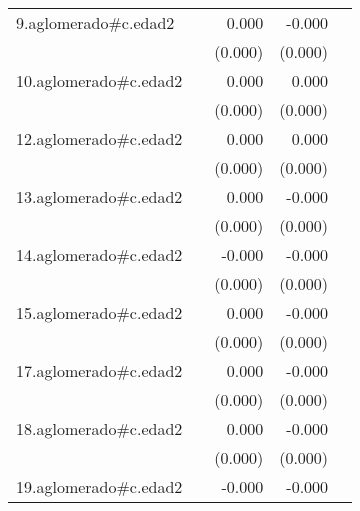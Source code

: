 {\begin{longtable}{l*{4}{D{.}{.}{-1}}}
\addlinespace
9.aglomerado#c.edad2&                     &       0.000         &      -0.000         &                     \\
            &                     &     (0.000)         &     (0.000)         &                     \\
\addlinespace
10.aglomerado#c.edad2&                     &       0.000         &       0.000         &                     \\
            &                     &     (0.000)         &     (0.000)         &                     \\
\addlinespace
12.aglomerado#c.edad2&                     &       0.000         &       0.000         &                     \\
            &                     &     (0.000)         &     (0.000)         &                     \\
\addlinespace
13.aglomerado#c.edad2&                     &       0.000         &      -0.000         &                     \\
            &                     &     (0.000)         &     (0.000)         &                     \\
\addlinespace
14.aglomerado#c.edad2&                     &      -0.000         &      -0.000\sym{**} &                     \\
            &                     &     (0.000)         &     (0.000)         &                     \\
\addlinespace
15.aglomerado#c.edad2&                     &       0.000         &      -0.000         &                     \\
            &                     &     (0.000)         &     (0.000)         &                     \\
\addlinespace
17.aglomerado#c.edad2&                     &       0.000         &      -0.000         &                     \\
            &                     &     (0.000)         &     (0.000)         &                     \\
\addlinespace
18.aglomerado#c.edad2&                     &       0.000         &      -0.000         &                     \\
            &                     &     (0.000)         &     (0.000)         &                     \\
\addlinespace
19.aglomerado#c.edad2&                     &      -0.000         &      -0.000         &                     \\

\end{longtable}}
